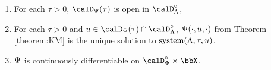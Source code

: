 \begin{proposition}
  \label{proposition:momentSpace-facts}
  \begin{enumerate}[label=(\alph*)]
    \item
      \label{proposition:momentSpace-facts:1}
      For each $\tau > 0$, $\momentSpace(\tau)$ is open in $\odeSpace^\circ$, 
    \item
      \label{proposition:momentSpace-facts:2}
      For each $\tau > 0$ and $\momentVar \in \momentSpace(\tau) \cap \odeSpace^\circ$, $\Psi(\cdot,u,\cdot)$ from Theorem \ref{theorem:KM} is the unique solution to $\operatorname{system}(\Lambda,\tau,u)$.
    \item
      \label{proposition:momentSpace-facts:3}
      $\Psi$ is continuously differentiable on $\momentSpace^\circ \times \stateSpace$.
  \end{enumerate}
\end{proposition}
